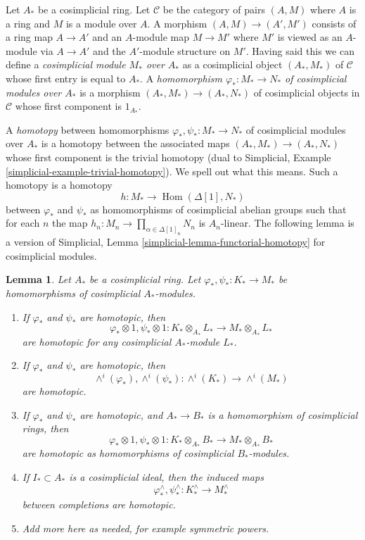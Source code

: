 \documentclass{stacks-project}
\theoremstyle{plain}
\newtheorem{lemma}[subsection]{Lemma}
\theoremstyle{definition}
\theoremstyle{remark}
\numberwithin{equation}{subsection}
\def\Hom{\mathop{\mathrm{Hom}}\nolimits}
\begin{document}
\medskip\noindent
Let $A_*$ be a cosimplicial ring. Let $\mathcal{C}$ be the category
of pairs $(A, M)$ where $A$ is a ring and $M$ is a module over $A$.
A morphism $(A, M) \to (A', M')$ consists of a ring map $A \to A'$ and
an $A$-module map $M \to M'$ where $M'$ is viewed as an $A$-module
via $A \to A'$ and the $A'$-module structure on $M'$. Having said this
we can define a {\it cosimplicial module $M_*$ over $A_*$} as a cosimplicial
object $(A_*, M_*)$ of $\mathcal{C}$ whose first entry is equal to $A_*$.
A {\it homomorphism $\varphi_* : M_* \to N_*$ of cosimplicial modules over
$A_*$} is a morphism $(A_*, M_*) \to (A_*, N_*)$ of cosimplicial objects
in $\mathcal{C}$ whose first component is $1_{A_*}$.

\medskip\noindent
A {\it homotopy} between homomorphisms $\varphi_*, \psi_* : M_* \to N_*$
of cosimplicial modules over $A_*$ is a homotopy between the associated
maps $(A_*, M_*) \to (A_*, N_*)$ whose first component is the
trivial homotopy (dual to
Simplicial, Example \ref{simplicial-example-trivial-homotopy}).
We spell out what this means. Such a homotopy is a homotopy
$$
h : M_* \longrightarrow \Hom(\Delta[1], N_*)
$$
between $\varphi_*$ and $\psi_*$ as homomorphisms of cosimplicial abelian
groups such that for each $n$ the map
$h_n : M_n \to \prod_{\alpha \in \Delta[1]_n} N_n$ is $A_n$-linear.
The following lemma is a version of
Simplicial, Lemma \ref{simplicial-lemma-functorial-homotopy}
for cosimplicial modules.

\begin{lemma}
\label{lemma-homotopy-tensor}
Let $A_*$ be a cosimplicial ring. Let $\varphi_*, \psi_* : K_* \to M_*$
be homomorphisms of cosimplicial $A_*$-modules.
\begin{enumerate}
\item
\label{item-tensor}
If $\varphi_*$ and $\psi_*$ are homotopic, then
$$
\varphi_* \otimes 1, \psi_* \otimes 1 :
K_* \otimes_{A_*} L_* \longrightarrow M_* \otimes_{A_*} L_*
$$
are homotopic for any cosimplicial $A_*$-module $L_*$.
\item
\label{item-wedge}
If $\varphi_*$ and $\psi_*$ are homotopic, then
$$
\wedge^i(\varphi_*), \wedge^i(\psi_*) :
\wedge^i(K_*) \longrightarrow \wedge^i(M_*)
$$
are homotopic.
\item
\label{item-base-change}
If $\varphi_*$ and $\psi_*$ are homotopic, and $A_* \to B_*$
is a homomorphism of cosimplicial rings, then
$$
\varphi_* \otimes 1, \psi_* \otimes 1 :
K_* \otimes_{A_*} B_* \longrightarrow M_* \otimes_{A_*} B_*
$$
are homotopic as homomorphisms of cosimplicial $B_*$-modules.
\item
\label{item-completion}
If $I_* \subset A_*$ is a cosimplicial ideal, then the induced
maps
$$
\varphi^\wedge_*, \psi^\wedge_* :
K_*^\wedge \longrightarrow M_*^\wedge
$$
between completions are homotopic.
\item Add more here as needed, for example symmetric powers.
\end{enumerate}
\end{lemma}
\end{document}
